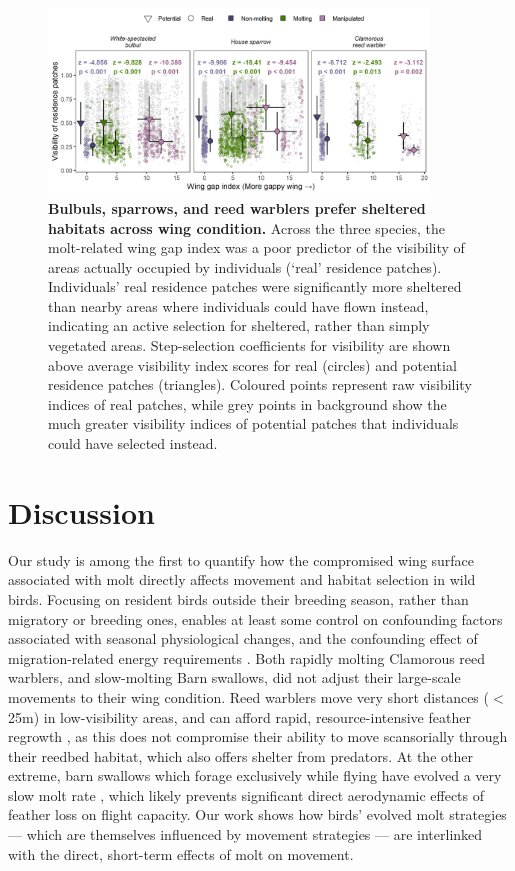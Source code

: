 \begin{refsection}
\begin{figure}%
\centering
\includegraphics[width=0.9\textwidth]{figures/holeybirds/fig_03.png}
\caption{
    \textbf{Bulbuls, sparrows, and reed warblers prefer sheltered habitats across wing condition.}
    Across the three species, the molt-related wing gap index was a poor predictor of the visibility of areas actually occupied by individuals (`real' residence patches).
    Individuals' real residence patches were significantly more sheltered than nearby areas where individuals could have flown instead, indicating an active selection for sheltered, rather than simply vegetated areas.
    Step-selection coefficients for visibility are shown above average visibility index scores for real (circles) and potential residence patches (triangles).
    Coloured points represent raw visibility indices of real patches, while grey points in background show the much greater visibility indices of potential patches that individuals could have selected instead.
}\label{fig3}
\end{figure}

\section*{Discussion}

Our study is among the first to quantify how the compromised wing surface associated with molt directly affects movement and habitat selection in wild birds.
Focusing on resident birds outside their breeding season, rather than migratory or breeding ones, enables at least some control on confounding factors associated with seasonal physiological changes, and the confounding effect of migration-related energy requirements \cite{alerstam1990,wikelski2003,horvitz2014}.
Both rapidly molting Clamorous reed warblers, and slow-molting Barn swallows, did not adjust their large-scale movements to their wing condition.
Reed warblers move very short distances ($<$ 25m) in low-visibility areas, and can afford rapid, resource-intensive feather regrowth \citep{lindstrom1993,newton2009,kiat2017}, as this does not compromise their ability to move scansorially through their reedbed habitat, which also offers shelter from predators.
At the other extreme, barn swallows which forage exclusively while flying have evolved a very slow molt rate \cite{kiat2016}, which likely prevents significant direct aerodynamic effects of feather loss on flight capacity.
Our work shows how birds' evolved molt strategies --- which are themselves influenced by movement strategies \cite{kiat2016} --- are interlinked with the direct, short-term effects of molt on movement.


\end{refsection}
